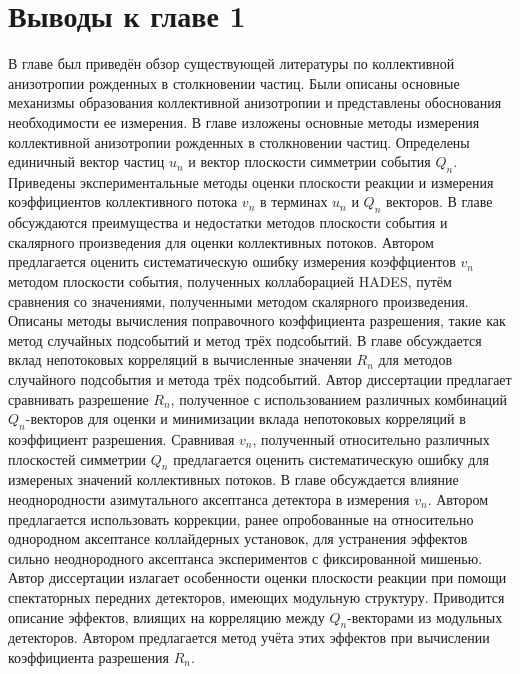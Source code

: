 \section{Выводы к главе 1}

В главе был приведён обзор существующей литературы по коллективной анизотропии рожденных в столкновении частиц. 
Были описаны основные механизмы образования коллективной анизотропии и представлены обоснования необходимости ее измерения.
В главе изложены основные методы измерения коллективной анизотропии рожденных в столкновении частиц.
Определены единичный вектор частиц $u_n$ и вектор плоскости симметрии события $Q_n$.
Приведены экспериментальные методы оценки плоскости реакции и измерения коэффициентов коллективного потока $v_n$ в терминах $u_n$ и $Q_n$ векторов.
В главе обсуждаются преимущества и недостатки методов плоскости события и скалярного произведения для оценки коллективных потоков. 
Автором предлагается оценить систематическую ошибку измерения коэффциентов $v_n$ методом плоскости события, полученных коллаборацией HADES, путём сравнения со значениями, полученными методом скалярного произведения.
Описаны методы вычисления поправочного коэффициента разрешения, такие как метод случайных подсобытий и метод трёх подсобытий.
В главе обсуждается вклад непотоковых корреляций в вычисленные значеняи $R_n$ для методов случайного подсобытия и метода трёх подсобытий.
Автор диссертации предлагает сравнивать разрешение $R_n$, полученное с использованием различных комбинаций $Q_n$-векторов для оценки и минимизации вклада непотоковых корреляций в коэффициент разрешения. 
Сравнивая $v_n$, полученный относительно различных плоскостей симметрии $Q_n$ предлагается оценить систематическую ошибку для измереных значений коллективных потоков. 
В главе обсуждается влияние неоднородности азимутального аксептанса детектора в измерения $v_n$.
Автором предлагается использовать коррекции, ранее опробованные на относительно однородном аксептансе коллайдерных установок, для устранения эффектов сильно неоднородного аксептанса экспериментов с фиксированной мишенью. 
Автор диссертации излагает особенности оценки плоскости реакции при помощи спектаторных передних детекторов, имеющих модульную структуру.
Приводится описание эффектов, влиящих на корреляцию между $Q_n$-векторами из модульных детекторов. 
Автором предлагается метод учёта этих эффектов при вычислении коэффициента разрешения $R_n$.